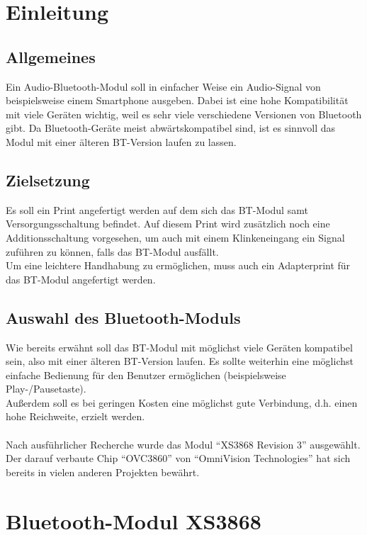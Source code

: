 \chapter{Einleitung}
\section{Allgemeines}
Ein Audio-Bluetooth-Modul soll in einfacher Weise ein Audio-Signal von beispielsweise einem Smartphone ausgeben. Dabei ist eine hohe Kompatibilität mit viele Geräten wichtig, weil es sehr viele verschiedene Versionen von Bluetooth gibt. Da Bluetooth-Geräte meist abwärtskompatibel sind, ist es sinnvoll das Modul mit einer älteren BT-Version laufen zu lassen.


\section{Zielsetzung}
Es soll ein Print angefertigt werden auf dem sich das BT-Modul samt Versorgungsschaltung befindet. Auf diesem Print wird zusätzlich noch eine Additionsschaltung vorgesehen, um auch mit einem Klinkeneingang ein Signal zuführen zu können, falls das BT-Modul ausfällt.\\
Um eine leichtere Handhabung zu ermöglichen, muss auch ein Adapterprint für das BT-Modul angefertigt werden.


\section{Auswahl des Bluetooth-Moduls}
Wie bereits erwähnt soll das BT-Modul mit möglichst viele Geräten kompatibel sein, also mit einer älteren BT-Version laufen. Es sollte weiterhin eine möglichst einfache Bedienung für den Benutzer ermöglichen (beispielsweise Play-/Pausetaste).\\
Außerdem soll es bei geringen Kosten eine möglichst gute Verbindung, d.h. einen hohe Reichweite, erzielt werden.\\ \\
Nach ausführlicher Recherche wurde das Modul \enquote{XS3868 Revision 3} ausgewählt. Der darauf verbaute Chip \enquote{OVC3860} von \enquote{OmniVision Technologies} hat sich bereits in vielen anderen Projekten bewährt. 


\chapter{Bluetooth-Modul XS3868}

